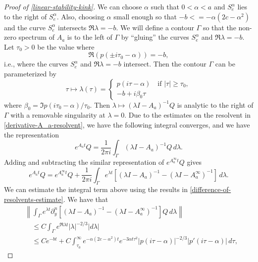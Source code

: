 \begin{proof}[Proof of \cref{linear-stability-kink}]
	We can choose \(\alpha\) such that \(0< \alpha < a\) and \(S_e^\alpha\) lies to the right of \(S_e^\alpha\). Also, choosing \(\alpha \) small enough so that \(-b < = - \alpha (2c - \alpha^2)\) and the curve \(S^\alpha_e\) intersects \(\Re \lambda = -b\). We will define a contour \(\Gamma\) so that the non-zero spectrum of \(A_a\) is to the left of \(\Gamma\) by ``gluing'' the curves \(S_e^\alpha\) and \(\Re \lambda = -b\). Let \(\tau_0> 0\) be the value where
	\begin{equation}
		\Re(p(\pm i \tau_0 - \alpha)) = -b,
	\end{equation}
	i.e., where the curves \(S^\alpha_e\) and \(\Re \lambda = - b\) intersect. Then the contour \(\Gamma\) can be parameterized by
	\begin{equation}
		\tau \mapsto \lambda(\tau) = \begin{cases}
			p(i\tau - \alpha) \quad \text{if } |\tau|\geq \tau_0,\\
			- b + i \beta_0 \tau
		\end{cases}
	\end{equation}
	where \(\beta_0 = \Im p(i\tau_0 - \alpha) / \tau_0\). Then \(\lambda \mapsto (\lambda I - A_a)^{-1} Q\) is analytic to the right of \(\Gamma\) with a removable singularity at \(\lambda = 0\). Due to the estimates on the resolvent in \cref{derivative-A_a-resolvent}, we have the following integral converges, and we have the representation
	\begin{equation}
		e^{A_at} Q = \frac 1 {2\pi i} \int_\Gamma (\lambda I - A_a)^{-1} Q\, d\lambda.
	\end{equation}
	Adding and subtracting the similar representation of \(e^{A_a^\infty t} Q\) gives
	\begin{equation}\label{semigroup-operator-aa}
		e^{A_at} Q = e^{A_a^\infty t} Q + \frac 1 {2 \pi i } \int_\Gamma e^{\lambda t} [ (\lambda I - A_a)^{-1} - (\lambda I - A_a^\infty)^{-1}] \, d\lambda.
	\end{equation}
	We can estimate the integral term above using the results in \cref{difference-of-resolvents-estimate}. We have that
	\begin{equation}
		\begin{aligned}
			&\left \| \int_\Gamma e^{\lambda t} \partial_y^n [(\lambda I - A_a)^{-1}  - (\lambda I - A_a^\infty)^{-1}] Q \, d\lambda \right \| \\
			&\quad\leq C \int_\Gamma e^{\Re \lambda t} |\lambda|^{-2/3} |d\lambda| \\
			&\quad\leq C e^{-bt} + C \int_{\tau_0}^\infty e^{- \alpha (2c - \alpha^2)t} e^{-3\alpha t \tau^2} |p(i\tau-\alpha)|^{-2/3} |p'(i\tau - \alpha)| \, d\tau,

\end{aligned}
\end{equation}
\end{proof}
